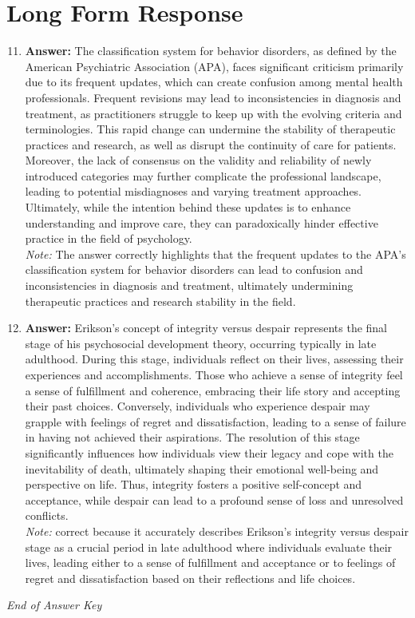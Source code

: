 \documentclass[12pt]{article}
\begin{document}
\section*{Long Form Response}
\begin{enumerate}[label=\arabic*.]
\setcounter{enumi}{10}
\item \textbf{Answer:} The classification system for behavior disorders, as defined by the American Psychiatric Association (APA), faces significant criticism primarily due to its frequent updates, which can create confusion among mental health professionals. Frequent revisions may lead to inconsistencies in diagnosis and treatment, as practitioners struggle to keep up with the evolving criteria and terminologies. This rapid change can undermine the stability of therapeutic practices and research, as well as disrupt the continuity of care for patients. Moreover, the lack of consensus on the validity and reliability of newly introduced categories may further complicate the professional landscape, leading to potential misdiagnoses and varying treatment approaches. Ultimately, while the intention behind these updates is to enhance understanding and improve care, they can paradoxically hinder effective practice in the field of psychology.
\\ \textit{Note:} The answer correctly highlights that the frequent updates to the APA's classification system for behavior disorders can lead to confusion and inconsistencies in diagnosis and treatment, ultimately undermining therapeutic practices and research stability in the field.
\item \textbf{Answer:} Erikson's concept of integrity versus despair represents the final stage of his psychosocial development theory, occurring typically in late adulthood. During this stage, individuals reflect on their lives, assessing their experiences and accomplishments. Those who achieve a sense of integrity feel a sense of fulfillment and coherence, embracing their life story and accepting their past choices. Conversely, individuals who experience despair may grapple with feelings of regret and dissatisfaction, leading to a sense of failure in having not achieved their aspirations. The resolution of this stage significantly influences how individuals view their legacy and cope with the inevitability of death, ultimately shaping their emotional well-being and perspective on life. Thus, integrity fosters a positive self-concept and acceptance, while despair can lead to a profound sense of loss and unresolved conflicts.
\\ \textit{Note:} correct because it accurately describes Erikson's integrity versus despair stage as a crucial period in late adulthood where individuals evaluate their lives, leading either to a sense of fulfillment and acceptance or to feelings of regret and dissatisfaction based on their reflections and life choices.
\end{enumerate}

\vfill
\noindent\textit{End of Answer Key}
\end{document}
